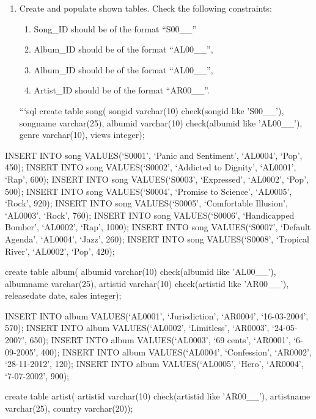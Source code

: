 \documentclass[
]{article}
\date{}
\providecommand{\tightlist}{%
  \setlength{\itemsep}{0pt}\setlength{\parskip}{0pt}}
\begin{document}
\begin{enumerate}
\def\labelenumi{\arabic{enumi}.}
\tightlist
\item
  Create and populate shown tables. Check the following constraints:

  \begin{enumerate}
  \def\labelenumii{\arabic{enumii}.}
  \tightlist
  \item
    Song\_ID should be of the format ``S00\_\_''
  \item
    Album\_ID should be of the format ``AL00\_\_'',
  \item
    Album\_ID should be of the format ``AL00\_\_'',
  \item
    Artist\_ID should be of the format ``AR00\_\_''.
  \end{enumerate}

  ```sql create table song( songid varchar(10) check(songid like
  'S00\_\_'), songname varchar(25), albumid varchar(10) check(albumid
  like 'AL00\_\_'), genre varchar(10), views integer);
\end{enumerate}

INSERT INTO song VALUES(`S0001', `Panic and Sentiment', `AL0004', `Pop',
450); INSERT INTO song VALUES(`S0002', `Addicted to Dignity', `AL0001',
`Rap', 600); INSERT INTO song VALUES(`S0003', `Expressed', `AL0002',
`Pop', 500); INSERT INTO song VALUES(`S0004', `Promise to Science',
`AL0005', `Rock', 920); INSERT INTO song VALUES(`S0005', `Comfortable
Illusion', `AL0003', `Rock', 760); INSERT INTO song VALUES(`S0006',
`Handicapped Bomber', `AL0002', `Rap', 1000); INSERT INTO song
VALUES(`S0007', `Default Agenda', `AL0004', `Jazz', 260); INSERT INTO
song VALUES(`S0008', `Tropical River', `AL0002', `Pop', 420);

create table album( albumid varchar(10) check(albumid like 'AL00\_\_'),
albumname varchar(25), artistid varchar(10) check(artistid like
'AR00\_\_'), releasedate date, sales integer);

INSERT INTO album VALUES(`AL0001', `Jurisdiction', `AR0004',
`16-03-2004', 570); INSERT INTO album VALUES(`AL0002', `Limitless',
`AR0003', `24-05-2007', 650); INSERT INTO album VALUES(`AL0003', `69
cents', `AR0001', `6-09-2005', 400); INSERT INTO album VALUES(`AL0004',
`Confession', `AR0002', `28-11-2012', 120); INSERT INTO album
VALUES(`AL0005', `Hero', `AR0004', `7-07-2002', 900);

create table artist( artistid varchar(10) check(artistid like
'AR00\_\_'), artistname varchar(25), country varchar(20));
\end{document}
